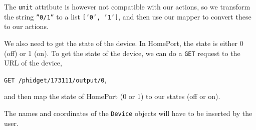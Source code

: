 The \texttt{unit} attribute is however not compatible with our actions, 
so we transform the string \texttt{''0/1''} to a list \texttt{['0', '1']}, 
and then use our mapper to convert these to our actions. 

We also need to get the state of the device. 
In HomePort, the state is either 0 (off) or 1 (on). 
To get the state of the device, 
we can do a \texttt{GET} request to the URL of the device, \eg 
\begin{center}
  \texttt{GET /phidget/173111/output/0},
\end{center}
and then map the state of HomePort (0 or 1) to our states (off or on). 

The names and coordinates of the \texttt{Device} objects will have to be inserted by the user. 

